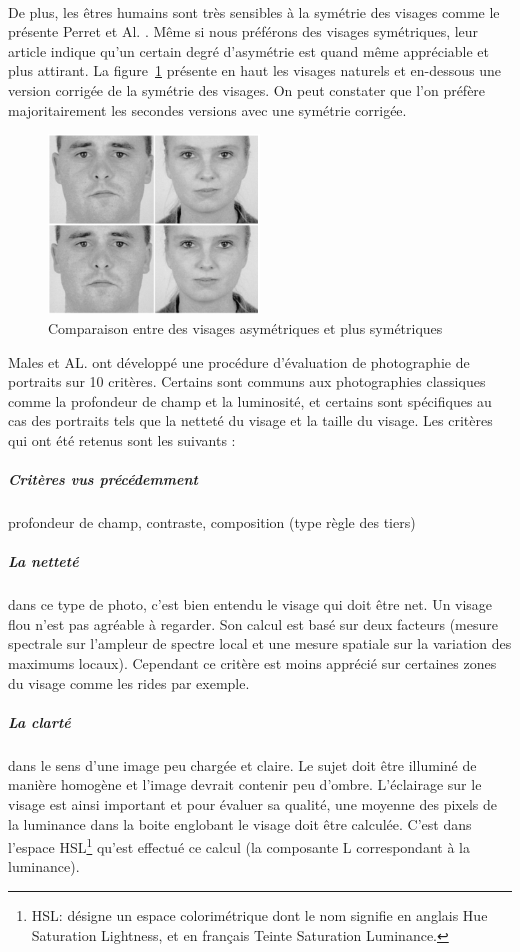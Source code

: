 \documentclass[11pt, french,screen]{report-rd-info}
\begin{document}
\paragraph*{}
De plus, les êtres humains sont très sensibles à la symétrie des visages comme le présente Perret et Al. \cite{Perrett1999}. Même si nous préférons des visages symétriques, leur article indique qu'un certain degré d'asymétrie est quand même appréciable et plus attirant. La figure~\ref{fig:VisagesSymetriques} présente en haut les visages naturels et en-dessous une version corrigée de la symétrie des visages. On peut constater que l'on préfère majoritairement les secondes versions avec une symétrie corrigée.
\begin{figure}
	\centering
	\includegraphics[width=0.5\textwidth]{Images/ea_visages_symetriques}
	\caption{Comparaison entre des visages asymétriques et plus symétriques\cite{Perrett1999}}
	\label{fig:VisagesSymetriques}
\end{figure}
Males et AL. \cite{Males2013} ont développé une procédure d'évaluation de photographie de portraits sur 10 critères. Certains sont communs aux photographies classiques comme la profondeur de champ et la luminosité, et certains sont spécifiques au cas des portraits tels que la netteté du visage et la taille du visage. Les critères qui ont été retenus sont les suivants :
\subparagraph{Critères vus précédemment} profondeur de champ, contraste, composition (type règle des tiers)
\subparagraph{La netteté} dans ce type de photo, c'est bien entendu le visage qui doit être net. Un visage flou n'est pas agréable à regarder. Son calcul est basé sur deux facteurs (mesure spectrale sur l’ampleur de spectre local et une mesure spatiale sur la variation des maximums locaux). Cependant ce critère est moins apprécié sur certaines zones du visage comme les rides par exemple.
\subparagraph{La clarté} dans le sens d'une image peu chargée et claire. Le sujet doit être illuminé de manière homogène et l’image devrait contenir peu d’ombre. L’éclairage sur le visage est ainsi important et pour évaluer sa qualité, une moyenne des pixels de la luminance dans la boite englobant le visage doit être calculée. C’est dans l’espace HSL\footnote{HSL: désigne un espace colorimétrique dont le nom signifie en anglais Hue Saturation Lightness, et en français Teinte Saturation Luminance.} qu’est effectué ce calcul (la composante L correspondant à la luminance).
\end{document}
